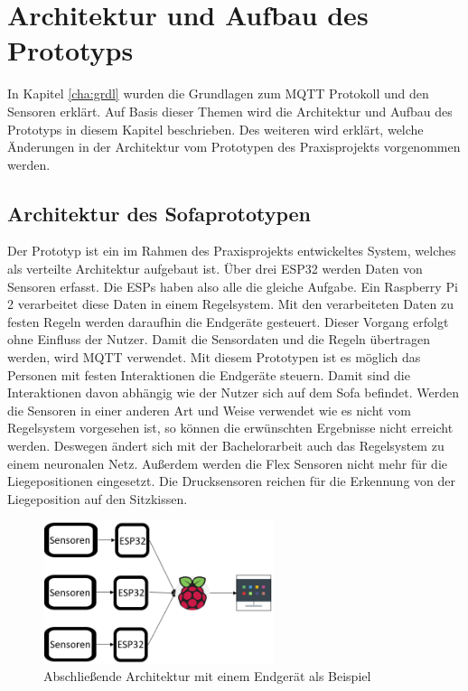 \chapter{Architektur und Aufbau des Prototyps}
\label{cha:arch_pro}
In Kapitel \ref{cha:grdl} wurden die Grundlagen zum MQTT Protokoll und den Sensoren erklärt. Auf Basis dieser Themen wird die Architektur und Aufbau des Prototyps in diesem Kapitel beschrieben. Des weiteren wird erklärt, welche Änderungen in der Architektur vom Prototypen des Praxisprojekts vorgenommen werden.

\section{Architektur des Sofaprototypen}
\label{sec:arch_sofa}
Der Prototyp ist ein im Rahmen des Praxisprojekts entwickeltes System, welches als verteilte Architektur aufgebaut ist. Über drei ESP32 werden Daten von Sensoren erfasst. Die ESPs haben also alle die gleiche Aufgabe.
\newline
Ein Raspberry Pi 2 verarbeitet diese Daten in einem Regelsystem. Mit den verarbeiteten Daten zu festen Regeln werden daraufhin die Endgeräte gesteuert. Dieser Vorgang erfolgt ohne Einfluss der Nutzer. Damit die Sensordaten und die Regeln übertragen werden, wird MQTT verwendet. Mit diesem Prototypen ist es möglich das Personen mit festen Interaktionen die Endgeräte steuern. Damit sind die Interaktionen davon abhängig wie der Nutzer sich auf dem Sofa befindet. Werden die Sensoren in einer anderen Art und Weise verwendet wie es nicht vom Regelsystem vorgesehen ist, so können die erwünschten Ergebnisse nicht erreicht werden.
\newline
Deswegen ändert sich mit der Bachelorarbeit auch das Regelsystem zu einem neuronalen Netz. Außerdem werden die Flex Sensoren nicht mehr für die Liegepositionen eingesetzt. Die Drucksensoren reichen für die Erkennung von der Liegeposition auf den Sitzkissen. 

\begin{figure}[H]
	\centering
		\includegraphics[width=0.6\textwidth]{images/Architektur.png}
	\caption{Abschließende Architektur mit einem Endgerät als Beispiel}
	\label{fig:arch}
\end{figure}

